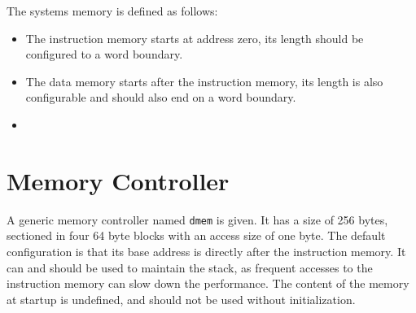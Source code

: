 The systems memory is defined as follows:
\begin{itemize}
\item The instruction memory starts at address zero, its length should be configured to a word boundary.
\item The data memory starts after the instruction memory, its length is also configurable and should also end on a word boundary.
\item 
\end{itemize}

\section{Memory Controller}
\label{sec:memoryctrl}
A generic memory controller named \verb=dmem= is given.
It has a size of 256 bytes, sectioned in four 64 byte blocks with an access size of one byte.
The default configuration is that its base address is directly after the instruction memory.
It can and should be used to maintain the stack, as frequent accesses to the instruction memory can slow down the performance.
The content of the memory at startup is undefined, and should not be used without initialization.